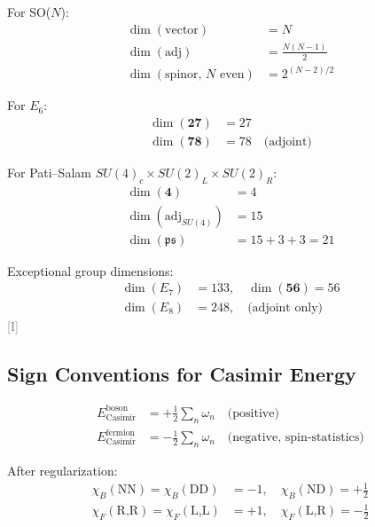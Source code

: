 \documentclass[11pt,a4paper]{article}
\newcommand{\tagI}{\textcolor{gray}{[I]}}
\begin{document}
For SO($N$):
\begin{align}
\label{eq:dim-so-vec}
\dim(\text{vector}) &= N \\
\label{eq:dim-so-adj}
\dim(\text{adj}) &= \frac{N(N-1)}{2} \\
\label{eq:dim-spinor-even}
\dim(\text{spinor, } N \text{ even}) &= 2^{(N-2)/2}
\end{align}

For $E_6$:
\begin{align}
\label{eq:dim-e6-27}
\dim(\mathbf{27}) &= 27 \\
\label{eq:dim-e6-78}
\dim(\mathbf{78}) &= 78 \quad \text{(adjoint)}
\end{align}

For Pati--Salam $SU(4)_c \times SU(2)_L \times SU(2)_R$:
\begin{align}
\label{eq:dim-ps-4}
\dim(\mathbf{4}) &= 4 \\
\label{eq:dim-ps-adj}
\dim(\text{adj}_{SU(4)}) &= 15 \\
\label{eq:dim-ps-total}
\dim(\mathfrak{ps}) &= 15 + 3 + 3 = 21
\end{align}

Exceptional group dimensions:
\begin{align}
\label{eq:dim-e7}
\dim(E_7) &= 133, \quad \dim(\mathbf{56}) = 56 \\
\label{eq:dim-e8}
\dim(E_8) &= 248, \quad \text{(adjoint only)}
\end{align}
\tagI

\subsection{Sign Conventions for Casimir Energy}

\begin{align}
\label{eq:sign-boson}
E_{\text{Casimir}}^{\text{boson}} &= +\frac{1}{2} \sum_n \omega_n \quad \text{(positive)} \\
\label{eq:sign-fermion}
E_{\text{Casimir}}^{\text{fermion}} &= -\frac{1}{2} \sum_n \omega_n \quad \text{(negative, spin-statistics)}
\end{align}

After regularization:
\begin{align}
\label{eq:chi-boson}
\chi_B(\text{NN}) = \chi_B(\text{DD}) &= -1, \quad \chi_B(\text{ND}) = +\frac{1}{2} \\
\label{eq:chi-fermion}
\chi_F(\text{R,R}) = \chi_F(\text{L,L}) &= +1, \quad \chi_F(\text{L,R}) = -\frac{1}{2}
\end{align}
\end{document}
